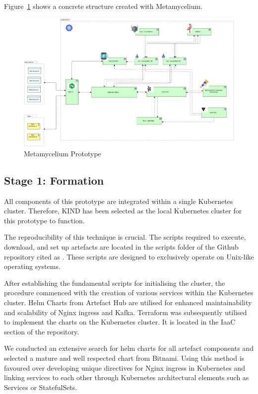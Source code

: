 \documentclass[preprint,12pt]{elsarticle}
\begin{document}
Figure~\ref{metamyceliumPrototype} shows a concrete structure created with Metamycelium.

\begin{figure}[h!]
    \centering
    \includegraphics[width=12cm]{images/metamyceliumConcrete.jpg}
    \caption{Metamycelium Prototype}
    \label{metamyceliumPrototype}
\end{figure}

\subsection{Stage 1: Formation}


All components of this prototype are integrated within a single Kubernetes cluster. Therefore, KIND \cite{KIND2023} has been selected as the local Kubernetes cluster for this prototype to function. 


The reproducibility of this technique is crucial. The scripts required to execute, download, and set up artefacts are located in the scripts folder of the Github repository cited as \citeauthor{InfrastructureForMetamycelium2023}. These scripts are designed to exclusively operate on Unix-like operating systems.

After establishing the fundamental scripts for initialising the cluster, the procedure commenced with the creation of various services within the Kubernetes cluster. Helm Charts from Artefact Hub \cite{ArtifactHub2023} are utilised for enhanced maintainability and scalability of Nginx ingress and Kafka. Terraform was subsequently utilised to implement the charts on the Kubernetes cluster. It is located in the IaaC section of the repository. 

We conducted an extensive search for helm charts for all artefact components and selected a mature and well respected chart from Bitnami. Using this method is favoured over developing unique directives for Nginx ingress in Kubernetes and linking services to each other through Kubernetes architectural elements such as Services or StatefulSets.
\end{document}
